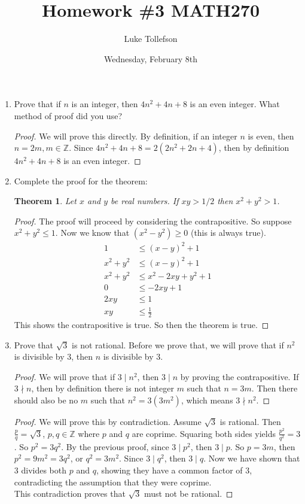 \documentclass[12pt]{article}
\newtheorem{theorem1}{Theorem}
\begin{document}
	
	\title{\Large Homework \#3 MATH270}
	\author{Luke Tollefson}
	\date{Wednesday, February 8th}
	
	\maketitle
	\begin{enumerate}
		\item Prove that if $n$ is an integer, 
		then $4n^2+4n+8$ is an even integer. 
		What method of proof did you use?
		\begin{proof}
		We will prove this directly. By definition, if an integer $n$ is even, then $n=2m,m\in {\mathbb{Z}}$. Since $4n^2+4n+8=2(2n^2+2n+4)$, then by definition $4n^2+4n+8$ is an even integer.
		\end{proof}
	
		\item Complete the proof for the theorem:
		\begin{theorem1}
			Let $x$ and $y$ be real numbers. If $xy>1/2$ then $x^2+y^2>1$.
		\end{theorem1}
		\begin{proof}
			The proof will proceed by considering the contrapositive. So suppose $x^2+y^2\leq 1$. Now we know that $(x^2-y^2)\geq 0$ (this is always true).
			\begin{align*}
			1&\leq (x-y)^2+1\\
			x^2+y^2&\leq (x-y)^2+1\\
			x^2+y^2&\leq x^2-2xy+y^2+1\\
			0&\leq -2xy+1\\
			2xy&\leq 1\\
			xy&\leq \frac{1}{2}
			\end{align*}
			This shows the contrapositive is true. So then the theorem is true.
		\end{proof}
		\newpage
		\item Prove that $\sqrt{3}$ is not rational. Before we prove that, we will prove that if $n^2$ is divisible by $3$, then $n$ is divisible by $3$.
		\begin{proof}
			We will prove that if $3\mid n^2$, then $3\mid n$ by proving the contrapositive. If $3\nmid n$, then by definition there is not integer $m$ such that $n=3m$. Then there should also be no $m$ such that $n^2=3(3m^2)$, which means $3\nmid n^2$.
		\end{proof}
		\begin{proof}
			We will prove this by contradiction. Assume $\sqrt{3}$ is rational. Then $\frac{p}{q}=\sqrt{3}$, $p,q\in \mathbb{Z}$ where $p$ and $q$ are coprime. Squaring both sides yields $\frac{p^2}{q^2}=3$. So $p^2=3q^2$. By the previous proof, since $3\mid p^2$, then $3\mid p$. So $p=3m$, then $p^2=9m^2=3q^2$, or $q^2=3m^2$. Since $3\mid q^2$, then $3\mid q$. Now we have shown that $3$ divides both $p$ and $q$, showing they have a common factor of $3$, contradicting the assumption that they were coprime.\\
			This contradiction proves that $\sqrt{3}$ must not be rational.
		\end{proof}
	

\end{enumerate}
\end{document}
